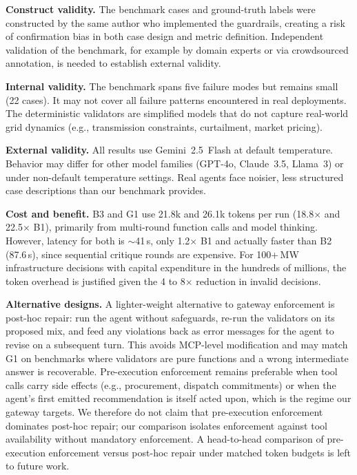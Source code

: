 \documentclass[conference]{IEEEtran}
\begin{document}
\textbf{Construct validity.}  The benchmark cases and ground-truth labels
were constructed by the same author who implemented the guardrails, creating
a risk of confirmation bias in both case design and metric definition.
Independent validation of the benchmark, for example by domain experts or
via crowdsourced annotation, is needed to establish external validity.

\textbf{Internal validity.}  The benchmark spans five failure modes but
remains small (22 cases).  It may not cover all failure patterns encountered
in real deployments.  The deterministic validators are simplified models
that do not capture real-world grid dynamics (e.g., transmission constraints,
curtailment, market pricing).

\textbf{External validity.}  All results use Gemini~2.5~Flash at default
temperature.  Behavior may differ for other model families (GPT-4o,
Claude~3.5, Llama~3) or under non-default temperature settings.  Real
agents face noisier, less structured case descriptions than our benchmark
provides.

\textbf{Cost and benefit.}  B3 and G1 use 21.8k and 26.1k tokens per run
(18.8$\times$ and 22.5$\times$ B1), primarily from multi-round function
calls and model thinking.  However, latency for both is ${\sim}$41\,s, only
1.2$\times$ B1 and actually faster than B2 (87.6\,s), since sequential
critique rounds are expensive.  For 100+\,MW infrastructure decisions
with capital expenditure in the hundreds of millions, the token overhead
is justified given the 4 to 8$\times$ reduction in invalid decisions.

\textbf{Alternative designs.}  A lighter-weight alternative to gateway
enforcement is post-hoc repair: run the agent without safeguards, re-run
the validators on its proposed mix, and feed any violations back as
error messages for the agent to revise on a subsequent turn.  This
avoids MCP-level modification and may match G1 on benchmarks where
validators are pure functions and a wrong intermediate answer is
recoverable.  Pre-execution enforcement remains preferable when tool
calls carry side effects (e.g., procurement, dispatch commitments) or
when the agent's first emitted recommendation is itself acted upon,
which is the regime our gateway targets.  We therefore do not claim that
pre-execution enforcement dominates post-hoc repair; our comparison isolates
enforcement against tool availability without mandatory enforcement.  A
head-to-head comparison of pre-execution enforcement versus post-hoc repair
under matched token budgets is left to future work.
\end{document}
